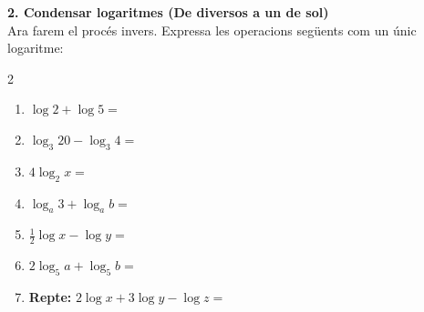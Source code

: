 \documentclass[12pt,a4paper]{article}
\begin{document}
\textbf{2. Condensar logaritmes (De diversos a un de sol)} \\
Ara farem el procés invers. Expressa les operacions següents com un únic logaritme:\\
\begingroup
\setlength{\fboxsep}{10pt}
\noindent{}
\endgroup
\vspace{0.4cm}
\begin{multicols}{2}
\begin{enumerate}[label=\alph*)]
    \item $\log 2 + \log 5 = $
    \item $\log_3 20 - \log_3 4 = $
    \item $4 \log_2 x = $
    \item $\log_a 3 + \log_a b = $
    \item $\frac{1}{2} \log x - \log y = $
    \item $2 \log_5 a + \log_5 b = $
    \item \textbf{Repte:} $2 \log x + 3 \log y - \log z = $
\end{enumerate}
\end{multicols}

\vspace{0.3cm}
\end{document}
